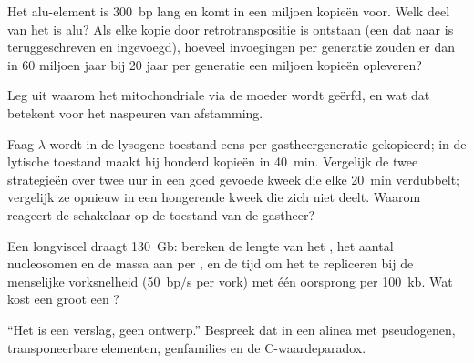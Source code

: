 \begin{exercise}[$\star\star$]\label{exo:b1:genomes:8}
Het alu-element is \qty{300}{bp} lang en komt in een miljoen kopieën voor. Welk
deel van het  is alu? Als elke kopie door retrotranspositie is ontstaan (een
 dat naar  is teruggeschreven en ingevoegd), hoeveel invoegingen per generatie
zouden er dan in \num{60} miljoen jaar bij \num{20} jaar per generatie een miljoen
kopieën opleveren?
\end{exercise}

\begin{exercise}[$\star\star$]\label{exo:b1:genomes:9}
Leg uit waarom het mitochondriale  via de moeder wordt geërfd, en wat dat
betekent voor het naspeuren van afstamming.
\end{exercise}

\begin{exercise}[$\star\star\star$]\label{exo:b1:genomes:10}
Faag $\lambda$ wordt in de lysogene toestand eens per gastheergeneratie gekopieerd;
in de lytische toestand maakt hij honderd kopieën in \qty{40}{min}. Vergelijk de
twee strategieën over twee uur in een goed gevoede kweek die elke \qty{20}{min}
verdubbelt; vergelijk ze opnieuw in een hongerende kweek die zich niet deelt.
Waarom reageert de schakelaar op de toestand van de gastheer?
\end{exercise}

\begin{exercise}[$\star\star\star$]\label{exo:b1:genomes:11}
Een longviscel draagt \qty{130}{Gb}: bereken de lengte van het , het aantal
nucleosomen en de massa aan  per , en de tijd om het te repliceren bij
de menselijke vorksnelheid (\qty{50}{bp/s} per vork) met één oorsprong per
\qty{100}{kb}. Wat kost een groot  een ?
\end{exercise}

\begin{exercise}[$\star\star\star$]\label{exo:b1:genomes:12}
``Het  is een verslag, geen ontwerp.'' Bespreek dat in een alinea met
pseudogenen, transponeerbare elementen, genfamilies en de C-waardeparadox.
\end{exercise}

